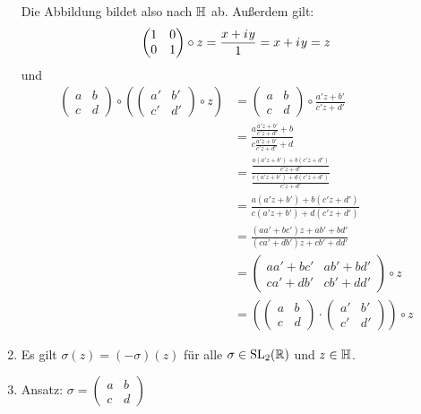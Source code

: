 \begin{beweis}
\begin{enumerate}[label=\alph*)]
              Die Abbildung bildet also nach $\mathbb{H}$ ab. Außerdem gilt:
              \[\begin{pmatrix}1&0\\0&1\end{pmatrix} \circ z = \frac{x+{i\mkern1mu} y}{1} = x + {i\mkern1mu} y = z\]
              und
              \begin{align*}
                \begin{pmatrix}a&b\\c&d\end{pmatrix} \circ  \left ( \begin{pmatrix}a'&b'\\c'&d'\end{pmatrix}   \circ z \right )&=
                            \begin{pmatrix}a&b\\c&d\end{pmatrix} \circ \frac{a'z + b'}{c'z + d'}\\
                    &= \frac{a \frac{a'z + b'}{c'z + d'} + b}{c \frac{a'z + b'}{c'z + d'} + d}\\
                    &= \frac{\frac{a(a'z+b') + b(c'z+d')}{c'z+d'}}{\frac{c(a'z+b')+d(c'z+d')}{c'z+d'}}\\
                    &= \frac{a(a'z+b')+b(c'z+d')}{c(a'z+b') + d(c'z+d')}\\
                    &= \frac{(aa'+bc')z + ab' + bd'}{(ca'+db')z + cb' + dd'}\\
                    &= \begin{pmatrix}aa'+bc'&ab'+bd'\\ca'+db'&cb'+dd'\end{pmatrix} \circ z\\
                    &= \left ( \begin{pmatrix}a&b\\c&d\end{pmatrix} \cdot \begin{pmatrix}a'&b'\\c'&d'\end{pmatrix} \right ) \circ z
              \end{align*}
        \item Es gilt $\sigma(z) = (-\sigma)(z)$ für alle $\sigma \in \mathrm{SL}_2(\mathbb{R})$
              und $z \in \mathbb{H}$.
        \item Ansatz: $\sigma = \begin{pmatrix}a & b\\c & d\end{pmatrix}$

\end{enumerate}
\end{beweis}
